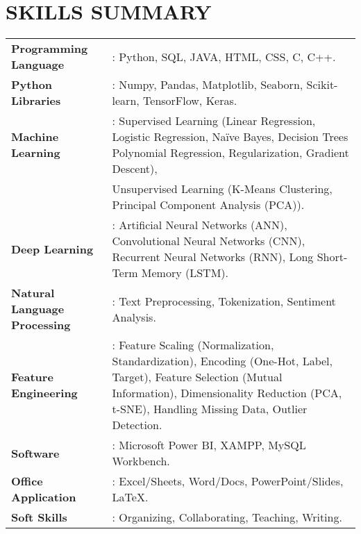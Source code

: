 \documentclass[letterpaper,11pt]{article}
\begin{document}
\section*{\textbf{SKILLS SUMMARY}}
\begin{tabular}{@{}p{} p{}}
    \textbf{Programming Language} & : Python, SQL, JAVA, HTML, CSS, C, C++.\\
    \textbf{Python Libraries} & : Numpy, Pandas, Matplotlib, Seaborn, Scikit-learn, TensorFlow, Keras.\\
    \textbf{Machine Learning} & : Supervised Learning (Linear Regression, Logistic Regression, Naïve Bayes, Decision Trees Polynomial Regression, Regularization, Gradient Descent),\\ 
    & Unsupervised Learning (K-Means Clustering, Principal Component Analysis (PCA)).\\
    \textbf{Deep Learning} & : Artificial Neural Networks (ANN), Convolutional Neural Networks (CNN), Recurrent Neural Networks (RNN), Long Short-Term Memory (LSTM).\\
    \textbf{Natural Language Processing} & : Text Preprocessing, Tokenization, Sentiment Analysis.\\
    \textbf{Feature Engineering} & : Feature Scaling (Normalization, Standardization), Encoding (One-Hot, Label, Target), Feature Selection (Mutual Information), Dimensionality Reduction (PCA, t-SNE), Handling Missing Data, Outlier Detection.\\
    \textbf{Software} & : Microsoft Power BI, XAMPP, MySQL Workbench. \\
    \textbf{Office Application} & : Excel/Sheets, Word/Docs, PowerPoint/Slides, LaTeX.\\
    \textbf{Soft Skills} & : Organizing, Collaborating, Teaching, Writing. \\
\end{tabular}
    
\end{document}

